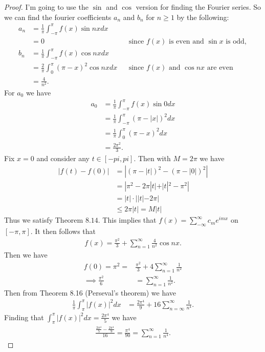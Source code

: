\documentclass[leqno]{article}
\theoremstyle{nonumberplain}
\newtheorem{proof}{Proof}
\begin{document}
\begin{proof}
I'm going to use the $\sin$ and $\cos$ version for finding the Fourier series. So we can find the fourier coefficients $a_n$ and $b_n$ for $n\geq 1$ by the following:
\begin{align*}
a_n &= \frac{1}{\pi} \int_{-\pi}^\pi f(x)\sin nx dx\\
&= 0 &&\textrm{since $f(x)$ is even and $\sin x$ is odd},\\
b_n &=\frac{1}{\pi} \int_{-\pi}^\pi f(x)\cos nx dx\\
&=\frac{2}{\pi} \int_{0}^\pi (\pi-x)^2 \cos nx dx &&\textrm{since $f(x)$ and $\cos nx$ are even}\\
&=\frac{4}{n^2}.
\end{align*}
For $a_0$ we have
\begin{align*}
a_0 &= \frac{1}{\pi}\int_{-\pi}^\pi f(x) \sin 0 dx\\
&= \frac{1}{\pi} \int_{-\pi}^\pi (\pi-|x|)^2 dx\\
&= \frac{1}{\pi} \int_{0}^\pi (\pi-x)^2 dx\\
&= \frac{2\pi^2}{3}.
\end{align*}
Fix $x=0$ and consider any $t\in [-pi,pi]$.  Then with $M=2\pi$ we have
\begin{align*}
|f(t)-f(0)|&=|(\pi-|t|)^2-(\pi-|0|)^2|\\
&= |\pi^2 - 2\pi |t| +|t|^2 -\pi^2|\\
&=|t|\cdot||t|-2\pi|\\
&\leq 2\pi |t|=M|t|
\end{align*}
Thus we satisfy Theorem $8.14$. This implies that $f(x)=\sum_{-\infty}^\infty c_m e^{imx}$ on $[-\pi,\pi]$.  It then follows that
\begin{align*}
f(x)= \frac{\pi^2}{3} + \sum_{n=1}^\infty \frac{4}{n^2} \cos nx.
\end{align*}
Then we have
\begin{align*}
f(0)=\pi^2=&\frac{\pi^2}{3}+4\sum_{n=1}^\infty \frac{1}{n^2}\\
\implies \frac{\pi^2}{6}&= \sum_{n=1}^\infty \frac{1}{n^2}. 
\end{align*}
Then from Theorem 8.16 (Perseval's theorem) we have
\begin{align*}
\frac{1}{\pi} \int_{\pi}^\pi |f(x)|^2 dx &= \frac{2\pi^4}{9}+16\sum_{n=\infty}^\infty \frac{1}{n^4}.
\end{align*}
Finding that $\int_{\pi}^\pi |f(x)|^2 dx = \frac{2\pi^4}{5}$ we have
\begin{align*}
\frac{\frac{2\pi^4}{5}-\frac{2\pi^4}{9}}{16}= \frac{\pi^4}{90} =\sum_{n=1}^\infty \frac{1}{n^4}.
\end{align*}
\end{proof}


\pagebreak
\end{document}
